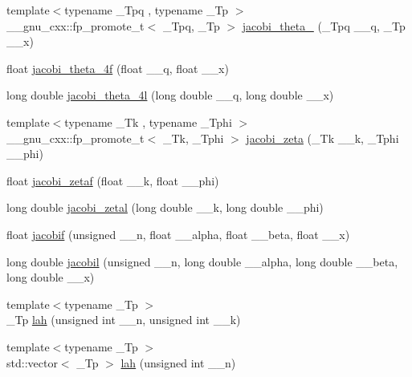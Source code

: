 \begin{DoxyCompactItemize}
\item 
{\footnotesize template$<$typename \+\_\+\+Tpq , typename \+\_\+\+Tp $>$ }\\\+\_\+\+\_\+gnu\+\_\+cxx\+::fp\+\_\+promote\+\_\+t$<$ \+\_\+\+Tpq, \+\_\+\+Tp $>$ \hyperlink{group__gnu__math__spec__func_ga676501b6284d5702a3dc61252e6c78ab}{jacobi\+\_\+theta\+\_} (\+\_\+\+Tpq \+\_\+\+\_\+q, \+\_\+\+Tp \+\_\+\+\_\+x)
\item 
float \hyperlink{group__gnu__math__spec__func_ga57dcc5ae4b1a3d1e38adccad85204bca}{jacobi\+\_\+theta\+\_\+4f} (float \+\_\+\+\_\+q, float \+\_\+\+\_\+x)
\item 
long double \hyperlink{group__gnu__math__spec__func_ga7c2a13198bdfd3f8cf1bc1758b1f56be}{jacobi\+\_\+theta\+\_\+4l} (long double \+\_\+\+\_\+q, long double \+\_\+\+\_\+x)
\item 
{\footnotesize template$<$typename \+\_\+\+Tk , typename \+\_\+\+Tphi $>$ }\\\+\_\+\+\_\+gnu\+\_\+cxx\+::fp\+\_\+promote\+\_\+t$<$ \+\_\+\+Tk, \+\_\+\+Tphi $>$ \hyperlink{group__gnu__math__spec__func_ga639be4ebef9a20572375ec534be52b07}{jacobi\+\_\+zeta} (\+\_\+\+Tk \+\_\+\+\_\+k, \+\_\+\+Tphi \+\_\+\+\_\+phi)
\item 
float \hyperlink{group__gnu__math__spec__func_gaedb6b352331c67b9dea73660e2045668}{jacobi\+\_\+zetaf} (float \+\_\+\+\_\+k, float \+\_\+\+\_\+phi)
\item 
long double \hyperlink{group__gnu__math__spec__func_ga9db158df9459aa12c840724338753913}{jacobi\+\_\+zetal} (long double \+\_\+\+\_\+k, long double \+\_\+\+\_\+phi)
\item 
float \hyperlink{group__gnu__math__spec__func_ga450db12e06d6993d169afab5b3f6d0b8}{jacobif} (unsigned \+\_\+\+\_\+n, float \+\_\+\+\_\+alpha, float \+\_\+\+\_\+beta, float \+\_\+\+\_\+x)
\item 
long double \hyperlink{group__gnu__math__spec__func_ga2898a5ebf451eaf259ecfcdd171aa72b}{jacobil} (unsigned \+\_\+\+\_\+n, long double \+\_\+\+\_\+alpha, long double \+\_\+\+\_\+beta, long double \+\_\+\+\_\+x)
\item 
{\footnotesize template$<$typename \+\_\+\+Tp $>$ }\\\+\_\+\+Tp \hyperlink{group__gnu__math__spec__func_gaa3491fabb0a6ef54a946a7a23ca866c7}{lah} (unsigned int \+\_\+\+\_\+n, unsigned int \+\_\+\+\_\+k)
\item 
{\footnotesize template$<$typename \+\_\+\+Tp $>$ }\\std\+::vector$<$ \+\_\+\+Tp $>$ \hyperlink{group__gnu__math__spec__func_ga161fe80a0d88f67a5a16ef2dcc3d4645}{lah} (unsigned int \+\_\+\+\_\+n)

\end{DoxyCompactItemize}
